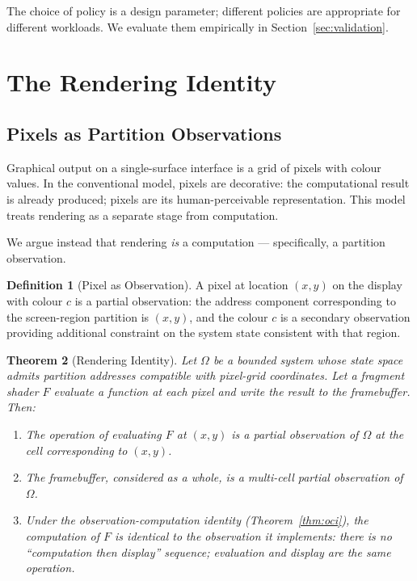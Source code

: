 \documentclass[11pt,a4paper]{article}
\newtheorem{theorem}{Theorem}[section]
\theoremstyle{definition}
\newtheorem{definition}[theorem]{Definition}
\theoremstyle{remark}
\begin{document}
The choice of policy is a design parameter; different policies are appropriate for different workloads. We evaluate them empirically in Section~\ref{sec:validation}.

\section{The Rendering Identity}
\label{sec:rendering}

\subsection{Pixels as Partition Observations}

Graphical output on a single-surface interface is a grid of pixels with colour values. In the conventional model, pixels are decorative: the computational result is already produced; pixels are its human-perceivable representation. This model treats rendering as a separate stage from computation.

We argue instead that rendering \emph{is} a computation --- specifically, a partition observation.

\begin{definition}[Pixel as Observation]
\label{def:pixel}
A pixel at location $(x, y)$ on the display with colour $c$ is a partial observation: the address component corresponding to the screen-region partition is $(x, y)$, and the colour $c$ is a secondary observation providing additional constraint on the system state consistent with that region.
\end{definition}

\begin{theorem}[Rendering Identity]
\label{thm:render-id}
Let $\Omega$ be a bounded system whose state space admits partition addresses compatible with pixel-grid coordinates. Let a fragment shader $F$ evaluate a function at each pixel and write the result to the framebuffer. Then:
\begin{enumerate}
    \item The operation of evaluating $F$ at $(x,y)$ is a partial observation of $\Omega$ at the cell corresponding to $(x,y)$.
    \item The framebuffer, considered as a whole, is a multi-cell partial observation of $\Omega$.
    \item Under the observation-computation identity (Theorem~\ref{thm:oci}), the computation of $F$ is identical to the observation it implements: there is no ``computation then display'' sequence; evaluation and display are the same operation.
\end{enumerate}
\end{theorem}
\end{document}

